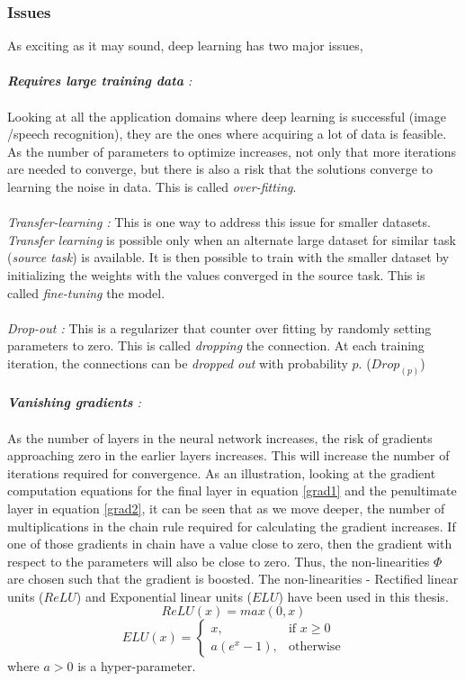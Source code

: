 \subsubsection{Issues}
\label{issues}
As exciting as it may sound, deep learning has two major issues,\\
\\
\textit{\textbf{Requires large training data} :}\\
\\
Looking at all the application domains where deep learning is successful (image /speech recognition), they are the ones where acquiring a lot of data is feasible. As the number of parameters to optimize increases, not only that more iterations are needed to converge, but there is also a risk that the solutions converge to learning the noise in data. This is called \textit{over-fitting}.\\
\\
\textit{Transfer-learning :} This is one way to address this issue for smaller datasets. \textit{Transfer learning} is possible only when an alternate large dataset for similar task (\textit{source task}) is available. It is  then possible to train with the smaller dataset by initializing the weights with the values converged in the source task. This is called \textit{fine-tuning} the model.\\
\\
\textit{Drop-out :} This is a regularizer that counter over fitting by randomly setting parameters to zero. This is called \textit{dropping} the connection. At each training iteration, the connections can be \textit{dropped out} with probability $p$. ($Drop_{(p)}$)\\  
\\
\textit{\textbf{Vanishing gradients} :}\\  
\\
As the number of layers in the neural network increases, the risk of gradients approaching zero in the earlier layers increases. This will increase the number of iterations required for convergence. As an illustration, looking at the gradient computation equations for the final layer in equation \ref{grad1} and the penultimate layer in equation \ref{grad2}, it can be seen that as we move deeper, the number of multiplications in the chain rule required for calculating the gradient increases. If one of those gradients in chain have a value close to zero, then the gradient with respect to the parameters will also be close to zero. Thus, the non-linearities $\Phi$ are chosen such that the gradient is boosted. The non-linearities - Rectified linear units ($ReLU$)\cite{relu} and Exponential linear units ($ELU$)\cite{elu} have been used in this thesis.  
\[
ReLU(x) = max(0,x)
\]     
\[
ELU(x) = 
\begin{cases}
x, & \text{if } x \geq 0 \\
a(e^{x}-1), & \text{otherwise}
\end{cases}
\]
where $a > 0$ is a hyper-parameter.